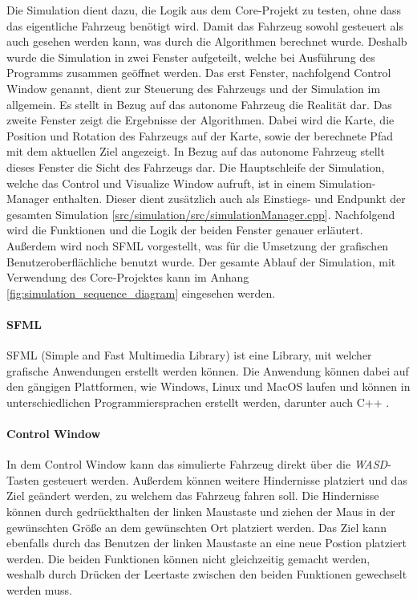 Die Simulation dient dazu, die Logik aus dem Core-Projekt zu testen, ohne dass das eigentliche Fahrzeug benötigt wird. 
Damit das Fahrzeug sowohl gesteuert als auch gesehen werden kann, was durch die Algorithmen berechnet wurde. 
Deshalb wurde die Simulation in zwei Fenster aufgeteilt, welche bei Ausführung des Programms zusammen geöffnet werden. 
Das erst Fenster, nachfolgend Control Window genannt, dient zur Steuerung des Fahrzeugs und der Simulation im allgemein. 
Es stellt in Bezug auf das autonome Fahrzeug die Realität dar. Das zweite Fenster zeigt die Ergebnisse der Algorithmen. 
Dabei wird die Karte, die Position und Rotation des Fahrzeugs auf der Karte, sowie der berechnete Pfad mit dem aktuellen Ziel angezeigt. 
In Bezug auf das autonome Fahrzeug stellt dieses Fenster die Sicht des Fahrzeugs dar. 
Die Hauptschleife der Simulation, welche das Control und Visualize Window aufruft, ist in einem Simulation-Manager enthalten. 
Dieser dient zusätzlich auch als Einstiegs- und Endpunkt der gesamten Simulation 
[\href{https://github.com/Jundy0/Studienarbeit/blob/main/src/simulation/src/simulationManager.cpp}{src/simulation/src/simulationManager.cpp}]. 
Nachfolgend wird die Funktionen und die Logik der beiden Fenster genauer erläutert. 
Außerdem wird noch SFML vorgestellt, was für die Umsetzung der grafischen Benutzeroberflächliche benutzt wurde. 
Der gesamte Ablauf der Simulation, mit Verwendung des Core-Projektes kann im Anhang \ref{fig:simulation_sequence_diagram} eingesehen werden. 

\paragraph{SFML} \mbox{}

SFML (Simple and Fast Multimedia Library) ist eine Library, mit welcher grafische Anwendungen erstellt werden können. 
Die Anwendung können dabei auf den gängigen Plattformen, wie Windows, Linux und MacOS laufen 
und können in unterschiedlichen Programmiersprachen erstellt werden, darunter auch C++ \cite{sfml}. 

\paragraph{Control Window} \mbox{}

In dem Control Window kann das simulierte Fahrzeug direkt über die \textit{WASD}-Tasten gesteuert werden. 
Außerdem können weitere Hindernisse platziert und das Ziel geändert werden, zu welchem das Fahrzeug fahren soll. 
Die Hindernisse können durch gedrückthalten der linken Maustaste und ziehen der Maus in der gewünschten Größe an dem gewünschten Ort platziert werden. 
Das Ziel kann ebenfalls durch das Benutzen der linken Maustaste an eine neue Postion platziert werden. 
Die beiden Funktionen können nicht gleichzeitig gemacht werden, weshalb durch Drücken der Leertaste zwischen den beiden Funktionen gewechselt werden muss. 


